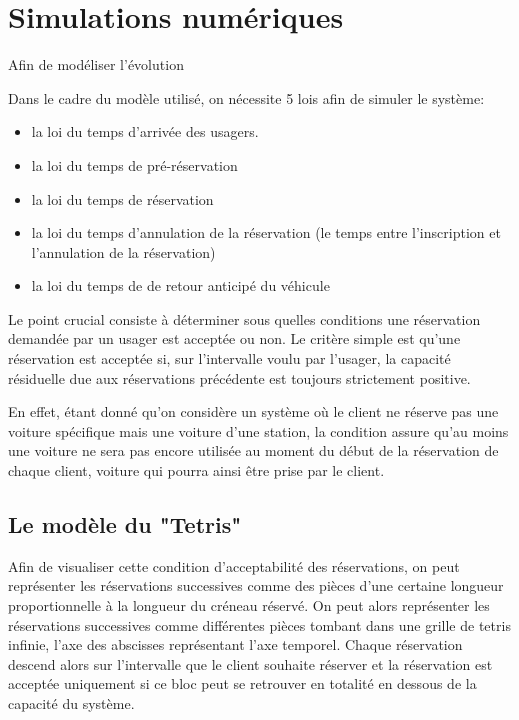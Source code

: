 \documentclass[12pt,a4paper]{article}
\newcommand{\1}[1]{\mathbbm{1}_{\{#1\}} }
\theoremstyle{definition}
\begin{document}
{\section{Simulations numériques}

Afin de modéliser l'évolution 


Dans le cadre du modèle utilisé, on nécessite 5 lois afin de simuler le système:
\begin{itemize}
\item la loi du temps d'arrivée des usagers.
\item la loi du temps de pré-réservation
\item la loi du temps de réservation
\item la loi du temps d'annulation de la réservation (le temps entre l'inscription et l'annulation de la réservation)
\item la loi du temps de de retour anticipé du véhicule
\end{itemize}

Le point crucial consiste à déterminer sous quelles conditions une réservation demandée par un usager est acceptée ou non.  Le critère simple est qu'une réservation est acceptée si, sur l'intervalle voulu par l'usager, la capacité résiduelle due aux réservations précédente est toujours strictement positive.

En effet, étant donné qu'on considère un système où le client ne réserve pas une voiture spécifique mais une voiture d'une station, la condition assure qu'au moins une voiture ne sera pas encore utilisée au moment du début de la réservation de chaque client, voiture qui pourra ainsi être prise par le client.


\subsection{Le modèle du "Tetris"}

Afin de visualiser cette condition d'acceptabilité des réservations, on peut représenter les réservations successives comme des pièces d'une certaine longueur proportionnelle à la longueur du créneau réservé. On peut alors représenter les réservations successives comme différentes pièces tombant dans une grille de tetris infinie, l'axe des abscisses représentant l'axe temporel.
Chaque réservation descend alors sur l'intervalle que  le client souhaite réserver et la réservation est acceptée uniquement si ce bloc peut se retrouver en totalité en dessous de la capacité du système.

}
\end{document}
